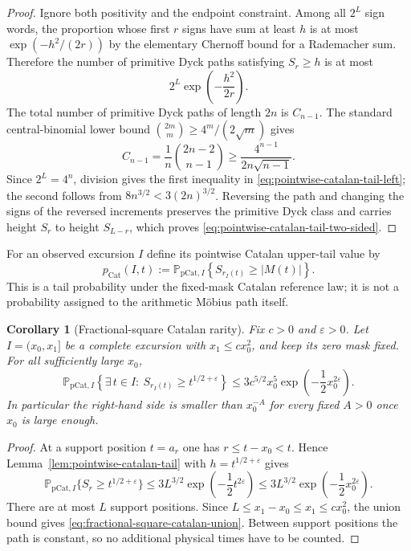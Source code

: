 \documentclass[11pt]{amsart}
\numberwithin{equation}{section}
\theoremstyle{plain}
\newtheorem{corollary}[theorem]{Corollary}
\theoremstyle{definition}
\theoremstyle{remark}
\newcommand{\eps}{\varepsilon}
\begin{document}
\begin{proof}
Ignore both positivity and the endpoint constraint.  Among all $2^L$ sign
words, the proportion whose first $r$ signs have sum at least $h$ is at most
$\exp(-h^2/(2r))$ by the elementary Chernoff bound for a Rademacher sum.
Therefore the number of primitive Dyck paths satisfying $S_r\ge h$ is at
most
\[
 2^L\exp\!\left(-\frac{h^2}{2r}\right).
\]
The total number of primitive Dyck paths of length $2n$ is $C_{n-1}$.  The
standard central-binomial lower bound
$\binom{2m}{m}\ge4^m/(2\sqrt m)$ gives
\[
 C_{n-1}=\frac1n\binom{2n-2}{n-1}
 \ge\frac{4^{n-1}}{2n\sqrt{n-1}}.
\]
Since $2^L=4^n$, division gives the first inequality in
\eqref{eq:pointwise-catalan-tail-left}; the second follows from
$8n^{3/2}<3(2n)^{3/2}$.  Reversing the path and changing the signs of the
reversed increments preserves the primitive Dyck class and carries height
$S_r$ to height $S_{L-r}$, which proves
\eqref{eq:pointwise-catalan-tail-two-sided}.
\end{proof}

For an observed excursion $I$ define its pointwise Catalan upper-tail value
by
\begin{equation}
\label{eq:pointwise-catalan-pvalue}
 p_{\mathrm{Cat}}(I,t):=
 \mathbb P_{\mathrm{pCat},I}
 \left\{S_{r_I(t)}\ge |M(t)|\right\}.
\end{equation}
This is a tail probability under the fixed-mask Catalan reference law; it is
not a probability assigned to the arithmetic M\"obius path itself.

\begin{corollary}[Fractional-square Catalan rarity]
\label{cor:fractional-square-catalan-rarity}
Fix $c>0$ and $\eps>0$.  Let $I=(x_0,x_1]$ be a complete excursion with
$x_1\le cx_0^2$, and keep its zero mask fixed.  For all sufficiently large
$x_0$,
\begin{equation}
\label{eq:fractional-square-catalan-union}
 \mathbb P_{\mathrm{pCat},I}
 \left\{\exists\,t\in I:\ S_{r_I(t)}\ge t^{1/2+\eps}\right\}
 \le 3c^{5/2}x_0^5
 \exp\!\left(-\frac12x_0^{2\eps}\right).
\end{equation}
In particular the right-hand side is smaller than $x_0^{-A}$ for every
fixed $A>0$ once $x_0$ is large enough.
\end{corollary}

\begin{proof}
At a support position $t=a_r$ one has $r\le t-x_0<t$.  Hence
Lemma~\ref{lem:pointwise-catalan-tail} with $h=t^{1/2+\eps}$ gives
\[
 \mathbb P_{\mathrm{pCat},I}\{S_r\ge t^{1/2+\eps}\}
 \le3L^{3/2}\exp\!\left(-\frac12t^{2\eps}\right)
 \le3L^{3/2}\exp\!\left(-\frac12x_0^{2\eps}\right).
\]
There are at most $L$ support positions.  Since
$L\le x_1-x_0\le x_1\le cx_0^2$, the union bound gives
\eqref{eq:fractional-square-catalan-union}.  Between support positions the
path is constant, so no additional physical times have to be counted.
\end{proof}
\end{document}
